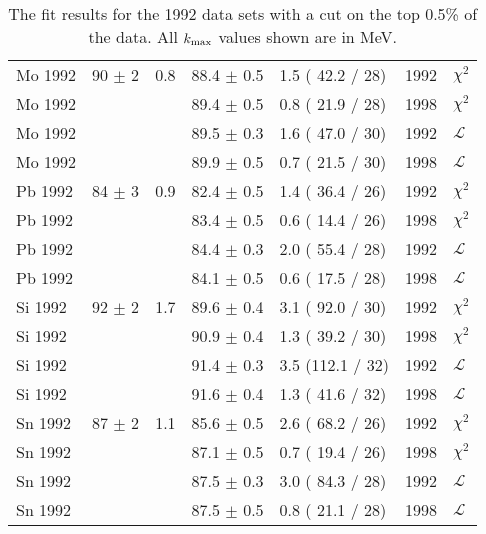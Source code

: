 \begin{table}[h]
\begin{center}
{\begin{tabular}{|l||l|l|l|l|l|l|}
        Mo 1992 & 90   $\pm$ 2   & 0.8 & 88.4 $\pm$ 0.5 & 1.5 ( 42.2 / 28) & 1992 & $\chi^2$      \\
        Mo 1992 &                &     & 89.4 $\pm$ 0.5 & 0.8 ( 21.9 / 28) & 1998 & $\chi^2$      \\
        Mo 1992 &                &     & 89.5 $\pm$ 0.3 & 1.6 ( 47.0 / 30) & 1992 & $\mathcal{L}$ \\
        Mo 1992 &                &     & 89.9 $\pm$ 0.5 & 0.7 ( 21.5 / 30) & 1998 & $\mathcal{L}$ \\
        \hline                                                                                    
        Pb 1992 & 84   $\pm$ 3   & 0.9 & 82.4 $\pm$ 0.5 & 1.4 ( 36.4 / 26) & 1992 & $\chi^2$      \\
        Pb 1992 &                &     & 83.4 $\pm$ 0.5 & 0.6 ( 14.4 / 26) & 1998 & $\chi^2$      \\
        Pb 1992 &                &     & 84.4 $\pm$ 0.3 & 2.0 ( 55.4 / 28) & 1992 & $\mathcal{L}$ \\
        Pb 1992 &                &     & 84.1 $\pm$ 0.5 & 0.6 ( 17.5 / 28) & 1998 & $\mathcal{L}$ \\
        \hline                                                                                    
        Si 1992 & 92   $\pm$ 2   & 1.7 & 89.6 $\pm$ 0.4 & 3.1 ( 92.0 / 30) & 1992 & $\chi^2$      \\
        Si 1992 &                &     & 90.9 $\pm$ 0.4 & 1.3 ( 39.2 / 30) & 1998 & $\chi^2$      \\
        Si 1992 &                &     & 91.4 $\pm$ 0.3 & 3.5 (112.1 / 32) & 1992 & $\mathcal{L}$ \\
        Si 1992 &                &     & 91.6 $\pm$ 0.4 & 1.3 ( 41.6 / 32) & 1998 & $\mathcal{L}$ \\
        \hline                                                                                    
        Sn 1992 & 87   $\pm$ 2   & 1.1 & 85.6 $\pm$ 0.5 & 2.6 ( 68.2 / 26) & 1992 & $\chi^2$      \\
        Sn 1992 &                &     & 87.1 $\pm$ 0.5 & 0.7 ( 19.4 / 26) & 1998 & $\chi^2$      \\
        Sn 1992 &                &     & 87.5 $\pm$ 0.3 & 3.0 ( 84.3 / 28) & 1992 & $\mathcal{L}$ \\
        Sn 1992 &                &     & 87.5 $\pm$ 0.5 & 0.8 ( 21.1 / 28) & 1998 & $\mathcal{L}$ \\
        \hline


      \end{tabular}
    }
  \end{center}
  \caption{The fit results for the 1992 data sets with a cut on the top 0.5\% of the data. All $\mbox{$k_{\rm max}$}$ values shown are in MeV.}
  \label{table:fits1992}
\end{table}

